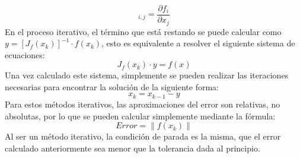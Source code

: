 \documentclass[journal]{IEEEtran}
\begin{document}
\begin{equation}
[J_{f}(x_{k})]_{i, j} = \frac{\partial f_{i}}{\partial x_{j}}
\label{eq:jacobiano}
\end{equation}
\indent En el proceso iterativo, el término que está restando se puede calcular como \(y = [J_{f}(x_{k})]^{-1} \cdot f(x_{k})\), esto es equivalente a resolver el siguiente sistema de ecuaciones:
\begin{equation}
J_{f}(x_{k}) \cdot y = f(x)
\label{eq:f(x)}
\end{equation}
\indent Una vez calculado este sistema, simplemente se pueden realizar las iteraciones necesarias para encontrar la solución de la siguiente forma:
\begin{equation}
x_{k} = x_{k - 1} - y
\label{eq:NRSimp}
\end{equation}
\indent Para estos métodos iterativos, las aproximaciones del error son relativas, no absolutas, por lo que se pueden calcular simplemente mediante la fórmula:
\begin{equation}
Error = \|f(x_{k})\| 
\label{eq:errorRel}
\end{equation}
\indent Al ser un método iterativo, la condición de parada es la misma, que el error calculado anteriormente sea menor que la tolerancia dada al principio.\\

%
%

\end{document}
